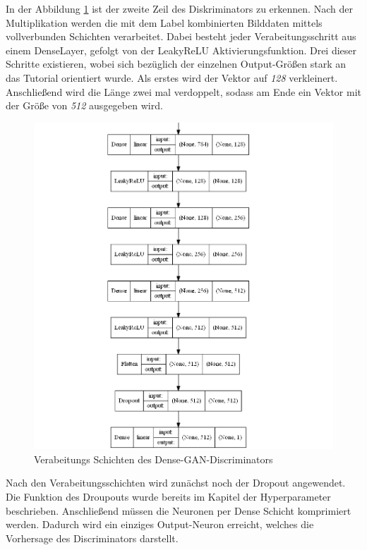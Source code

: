 In der Abbildung \ref{architecture:densegan-dis-dense} ist der zweite Zeil des Diskriminators zu erkennen.
Nach der Multiplikation werden die mit dem Label kombinierten Bilddaten mittels vollverbunden Schichten verarbeitet.
Dabei besteht jeder Verabeitungsschritt aus einem DenseLayer, gefolgt von der LeakyReLU Aktivierungsfunktion.
Drei dieser Schritte existieren, wobei sich bezüglich der einzelnen Output-Größen stark an das Tutorial orientiert wurde.
Als erstes wird der Vektor auf \textit{128} verkleinert.
Anschließend wird die Länge zwei mal verdoppelt, sodass am Ende ein Vektor mit der Größe von \textit{512} ausgegeben wird.

\begin{figure}[H]
	\centering
	\includegraphics[width=0.6\textheight]{kapitel/5_ergebnisse/architectures/densegan_discriminator/dense.png}
	\caption{Verabeitungs Schichten des Dense-GAN-Discriminators}
	\label{architecture:densegan-dis-dense}
\end{figure}

Nach den Verabeitungsschichten wird zunächst noch der Dropout angewendet.
Die Funktion des Droupouts wurde bereits im Kapitel der Hyperparameter beschrieben.
Anschließend müssen die Neuronen per Dense Schicht komprimiert werden.
Dadurch wird ein einziges Output-Neuron erreicht, welches die Vorhersage des Discriminators darstellt.

